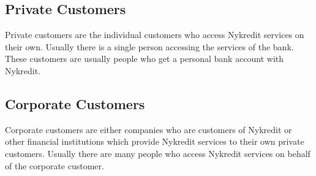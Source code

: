 \subsection{Private Customers}
Private customers are the individual customers who access Nykredit services on their own. Usually there is a single person accessing the services of the bank. These customers are usually people who get a personal bank account with Nykredit.
\subsection{Corporate Customers}
Corporate customers are either companies who are customers of Nykredit or other financial institutions which provide Nykredit services to their own private customers. Usually there are many people who access Nykredit services on behalf of the corporate customer.
